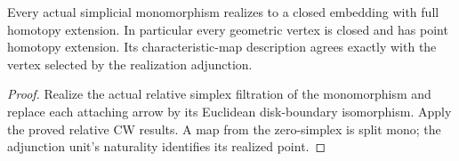 \begin{proposition}
  \label{prop:realized-mono-closed-cofibration}
  \leanok
  Every actual simplicial monomorphism realizes to a closed embedding with full homotopy extension. In particular every geometric vertex is closed and has point homotopy extension. Its characteristic-map description agrees exactly with the vertex selected by the realization adjunction.
\end{proposition}
\begin{proof}
  Realize the actual relative simplex filtration of the monomorphism and replace each attaching arrow by its Euclidean disk-boundary isomorphism. Apply the proved relative CW results. A map from the zero-simplex is split mono; the adjunction unit's naturality identifies its realized point.
  \leanok
\end{proof}

